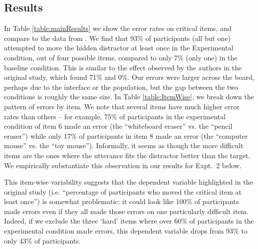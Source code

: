 \documentclass[manuscript]{stjour}
\begin{document}
\subsection{Results}

In Table \ref{table:mainResults} we show the error rates on critical items, and compare to the data from
\cite{KeysarLinBarr03_LimitsOnTheoryOfMindUse}.
We find that 93\% of participants (all but one) attempted to move the hidden distractor at least once in the Experimental condition, out of four possible items, compared to only 7\% (only one) in the baseline condition. This is similar to the effect observed by the authors in the original study, which found 71\% and 0\%. Our errors were larger across the board, perhaps due to the interface or the population, but the gap between the two conditions is roughly the same size.
In Table \ref{table:ItemWise}, we break down the pattern of errors by item. 
We note that several items have much higher error rates than others -- for example, 75\% of participants in the experimental condition of item 6 made an error (the ``whiteboard eraser'' vs. the ``pencil eraser'') while only 17\% of participants in item 8 made an error (the ``computer mouse'' vs. the ``toy mouse''). Informally, it seems as though the more difficult items are the ones where the utterance fits the distractor better than the target. We empirically substantiate this observation in our results for Expt.~2 below.

This item-wise variability suggests that the dependent variable highlighted in the original study (i.e. ``percentage of participants who moved the critical item at least once'') is somewhat problematic: it could look like 100\% of participants made errors even if they all made those errors on one particularly difficult item. Indeed, if we exclude the three `hard' items where over 60\% of participants in the experimental condition made errors, this dependent variable drops from 93\% to only 43\% of participants. 
\end{document}
